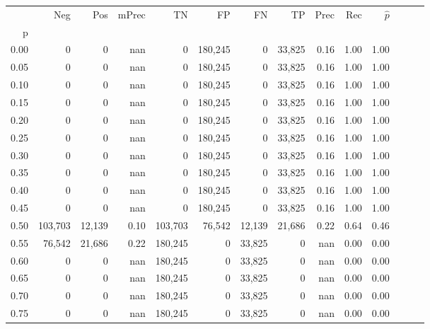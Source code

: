 \begin{tabular}{rrrrrrrrrrrrrr}
\toprule
{} &      Neg &     Pos & mPrec &       TN &       FP &      FN &      TP &  Prec &   Rec & $\hat{p}$ \\
p    &          &         &       &          &          &         &         &       &       &           \\
\midrule
0.00 &        0 &       0 &   nan &        0 &  180,245 &       0 &  33,825 &  0.16 &  1.00 &      1.00 \\
0.05 &        0 &       0 &   nan &        0 &  180,245 &       0 &  33,825 &  0.16 &  1.00 &      1.00 \\
0.10 &        0 &       0 &   nan &        0 &  180,245 &       0 &  33,825 &  0.16 &  1.00 &      1.00 \\
0.15 &        0 &       0 &   nan &        0 &  180,245 &       0 &  33,825 &  0.16 &  1.00 &      1.00 \\
0.20 &        0 &       0 &   nan &        0 &  180,245 &       0 &  33,825 &  0.16 &  1.00 &      1.00 \\
0.25 &        0 &       0 &   nan &        0 &  180,245 &       0 &  33,825 &  0.16 &  1.00 &      1.00 \\
0.30 &        0 &       0 &   nan &        0 &  180,245 &       0 &  33,825 &  0.16 &  1.00 &      1.00 \\
0.35 &        0 &       0 &   nan &        0 &  180,245 &       0 &  33,825 &  0.16 &  1.00 &      1.00 \\
0.40 &        0 &       0 &   nan &        0 &  180,245 &       0 &  33,825 &  0.16 &  1.00 &      1.00 \\
0.45 &        0 &       0 &   nan &        0 &  180,245 &       0 &  33,825 &  0.16 &  1.00 &      1.00 \\
0.50 &  103,703 &  12,139 &  0.10 &  103,703 &   76,542 &  12,139 &  21,686 &  0.22 &  0.64 &      0.46 \\
0.55 &   76,542 &  21,686 &  0.22 &  180,245 &        0 &  33,825 &       0 &   nan &  0.00 &      0.00 \\
0.60 &        0 &       0 &   nan &  180,245 &        0 &  33,825 &       0 &   nan &  0.00 &      0.00 \\
0.65 &        0 &       0 &   nan &  180,245 &        0 &  33,825 &       0 &   nan &  0.00 &      0.00 \\
0.70 &        0 &       0 &   nan &  180,245 &        0 &  33,825 &       0 &   nan &  0.00 &      0.00 \\
0.75 &        0 &       0 &   nan &  180,245 &        0 &  33,825 &       0 &   nan &  0.00 &      0.00 \\

\end{tabular}
